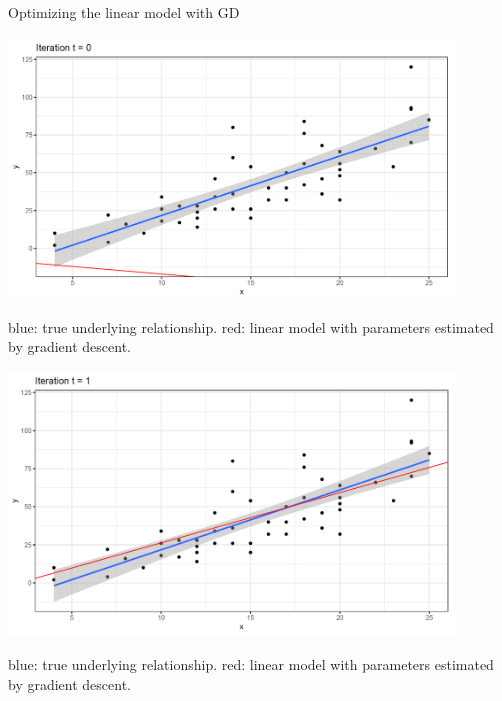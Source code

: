 \begin{vbframe}{Optimizing the linear model with GD}
	\framebreak
	
	
	\begin{center}
	\includegraphics[width = 0.9\textwidth]{figure_man/solution01.png}\\
	\begin{footnotesize}
		blue: true underlying relationship. red: linear model with parameters estimated by gradient descent.
	\end{footnotesize}
	\end{center}


	
	\framebreak
	
	\begin{center}
	\includegraphics[width = 0.9\textwidth]{figure_man/solution02.png}\\
	\begin{footnotesize}
		blue: true underlying relationship. red: linear model with parameters estimated by gradient descent.
	\end{footnotesize}
	\end{center}
	
	\framebreak
	

\end{vbframe}
